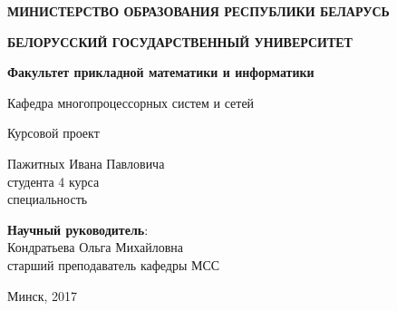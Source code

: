 \begin{titlepage}
    \begin{center}
         \textbf{МИНИСТЕРСТВО ОБРАЗОВАНИЯ РЕСПУБЛИКИ БЕЛАРУСЬ}
    \end{center}
    \begin{center}
         \textbf{БЕЛОРУССКИЙ ГОСУДАРСТВЕННЫЙ УНИВЕРСИТЕТ}
    \end{center}
    \begin{center}
         \textbf{Факультет прикладной математики и информатики}
    \end{center}
    \begin{center}
        Кафедра многопроцессорных систем и сетей
    \end{center}

    \vspace{9em}

    \begin{center}
        \textbf{\@jobtitle}
    \end{center}

    \vspace{2em}

    \begin{center}
        Курсовой проект
    \end{center}

    \vspace{4em}

    \begin{flushright}
        Пажитных Ивана Павловича\\
        студента 4 курса\\
        специальность \\
    \end{flushright}

    \vspace{1em}

    \begin{flushright}
         \textbf{Научный руководитель}:\\
        Кондратьева Ольга Михайловна\\
        старший преподаватель кафедры МСС\\
    \end{flushright}

    \vfill

    \begin{center}
        Минск, 2017
    \end{center}
\end{titlepage}
\newpage
